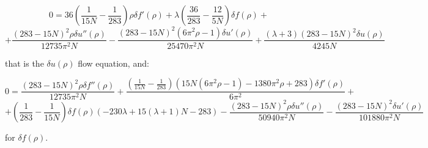 $$0 =36 \left(\frac{1}{15N}-\frac{1}{283}\right) \rho  \delta f'(\rho )+\lambda  \left(\frac{36}{283}-\frac{12}{5 N}\right) \delta f(\rho) + $$
$$+\frac{(283-15 N)^2 \rho \delta u''(\rho )}{12735 \pi ^2 N}-\frac{(283-15 N)^2 \left(6 \pi ^2 \rho -1\right) \delta u'(\rho )}{25470 \pi^2 N}+\frac{(\lambda +3) (283-15 N)^2 \delta u(\rho )}{4245 N}$$

that is the $\delta u(\rho) $ flow equation, and:

$$0=\frac{(283-15N)^2 \rho\delta f''(\rho )}{12735 \pi ^2 N}+\frac{\left(\frac{1}{15 N}-\frac{1}{283}\right) \left(15 N \left(6 \pi ^2 \rho -1\right)-1380 \pi ^2 \rho +283\right) \delta f'(\rho )}{6 \pi ^2}+$$
$$+\left(\frac{1}{283}-\frac{1}{15 N}\right) \delta f(\rho ) (-230 \lambda +15 (\lambda +1) N-283)-\frac{(283-15 N)^2 \rho  \delta u''(\rho )}{50940 \pi ^2 N}-\frac{(283-15 N)^2 \delta u'(\rho )}{101880 \pi ^2 N}$$

for $\delta f(\rho)$.

